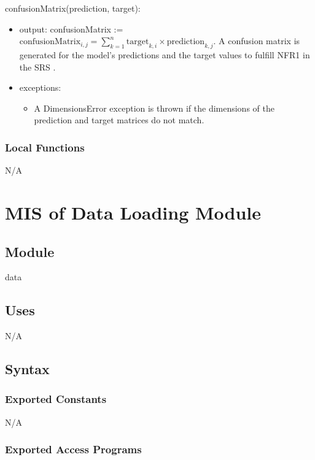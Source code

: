 \documentclass[12pt, titlepage]{article}
\begin{document}
\noindent confusionMatrix(prediction, target):
\begin{itemize}
\item output: confusionMatrix := $\text{confusionMatrix}_{i,j} = \sum_{k=1}^{n} \text{target}_{k,i} \times \text{prediction}_{k,j}$. A confusion matrix is generated for the
model's predictions and the target values to fulfill NFR1 in the SRS
\cite[5.2]{SRS}.
\item exceptions:
\begin{itemize}
  \item A DimensionsError exception is thrown if the dimensions of the prediction
  and target matrices do not match.
\end{itemize}
\end{itemize}

\subsubsection{Local Functions}

N/A

\newpage
\section{MIS of Data Loading Module} \label{MDataLoading}

\subsection{Module}

data
\subsection{Uses}

N/A

\subsection{Syntax}

\subsubsection{Exported Constants}

N/A

\subsubsection{Exported Access Programs}
\end{document}
